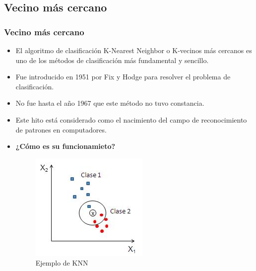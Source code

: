 \documentclass[9pt]{beamer} %
\begin{document}
	\subsection{Vecino más cercano}
		\begin{frame}
		\frametitle{Vecino más cercano}
		\begin{itemize}
		\item El algoritmo de clasificación K-Nearest Neighbor o K-vecinos más cercanos es uno de los métodos de clasificación más fundamental y sencillo.
		\item Fue introducido en 1951 por Fix y Hodge para resolver el problema de clasificación.
		\item No fue hasta el año 1967 que este método no tuvo constancia.
		\item Este hito está considerado como el nacimiento del campo de reconocimiento de patrones en computadores.
		\item \textbf{¿Cómo es su funcionamieto?}
				\begin{figure}[H]
		\includegraphics[scale=0.6]{ejemploKNN} 
		\caption{Ejemplo de KNN}
	\end{figure}
			\end{itemize}
		\end{frame}
\end{document}
